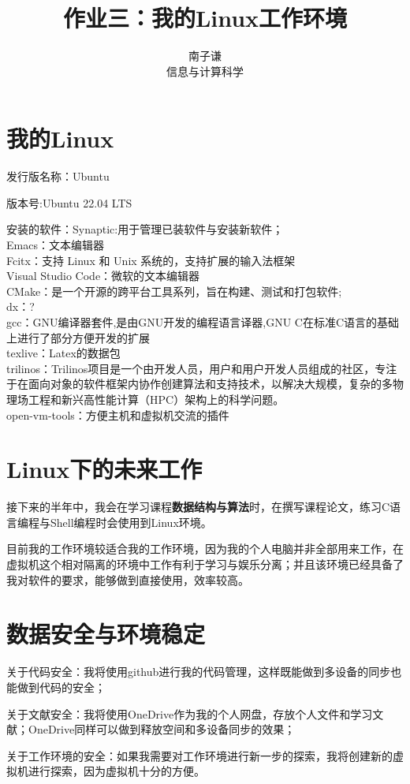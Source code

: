 \documentclass{ctexart}
\title{作业三：我的Linux工作环境}
\author{南子谦 \\ 信息与计算科学\quad 3210104676}
\begin{document}
\maketitle

\section{我的Linux}
发行版名称：Ubuntu
\par 版本号:Ubuntu 22.04 LTS
\par 安装的软件：Synaptic:用于管理已装软件与安装新软件；
\\ Emacs：文本编辑器
\\ Fcitx：支持 Linux 和 Unix 系统的，支持扩展的输入法框架
\\ Visual Studio Code：微软的文本编辑器
\\ CMake：是一个开源的跨平台工具系列，旨在构建、测试和打包软件;
\\ dx：?
\\ gcc：GNU编译器套件,是由GNU开发的编程语言译器,GNU C在标准C语言的基础上进行了部分方便开发的扩展
\\ texlive：Latex的数据包
\\ trilinos：Trilinos项目是一个由开发人员，用户和用户开发人员组成的社区，专注于在面向对象的软件框架内协作创建算法和支持技术，以解决大规模，复杂的多物理场工程和新兴高性能计算（HPC）架构上的科学问题。
\\ open-vm-tools：方便主机和虚拟机交流的插件

\section{Linux下的未来工作}
接下来的半年中，我会在学习课程\textbf{数据结构与算法}时，在撰写课程论文，练习C语言编程与Shell编程时会使用到Linux环境。
\par 目前我的工作环境较适合我的工作环境，因为我的个人电脑并非全部用来工作，在虚拟机这个相对隔离的环境中工作有利于学习与娱乐分离；并且该环境已经具备了我对软件的要求，能够做到直接使用，效率较高。
\section{数据安全与环境稳定}
关于代码安全：我将使用github进行我的代码管理，这样既能做到多设备的同步也能做到代码的安全；
\par 关于文献安全：我将使用OneDrive作为我的个人网盘，存放个人文件和学习文献；OneDrive同样可以做到释放空间和多设备同步的效果；
\par 关于工作环境的安全：如果我需要对工作环境进行新一步的探索，我将创建新的虚拟机进行探索，因为虚拟机十分的方便。




\nocite{qiu2012}
\end{document}
